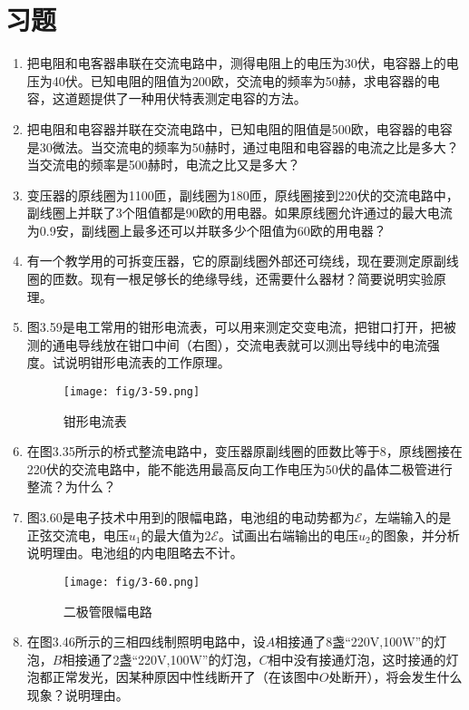 \section*{习题}
\begin{enumerate}
    \item 把电阻和电客器串联在交流电路中，测得电阻上的电压为30伏，电容器上的电压为40伏。已知电阻的阻值为200欧，交流电的频率为50赫，求电容器的电容，这道题提供了一种用伏特表测定电容的方法。
    \item 把电阻和电容器并联在交流电路中，已知电阻的阻值是500欧，电容器的电容是30微法。当交流电的频率为50赫时，通过电阻和电容器的电流之比是多大？当交流电的频率是500赫时，电流之比又是多大？
    \item 变压器的原线圈为1100匝，副线圈为180匝，原线圈接到220伏的交流电路中，副线圈上并联了3个阻值都是90欧的用电器。如果原线圈允许通过的最大电流为0.9安，副线圈上最多还可以并联多少个阻值为60欧的用电器？
    \item 有一个教学用的可拆变压器，它的原副线圈外部还可绕线，现在要测定原副线圈的匝数。现有一根足够长的绝缘导线，还需要什么器材？简要说明实验原理。
    \item 图3.59是电工常用的钳形电流表，可以用来测定交变电流，把钳口打开，把被测的通电导线放在钳口中间（右图），交流电表就可以测出导线中的电流强度。试说明钳形电流表的工作原理。
\begin{figure}[htp]\centering
\texttt{[image: fig/3-59.png]}
\caption{钳形电流表}
\end{figure}
    \item 在图3.35所示的桥式整流电路中，变压器原副线圈的匝数比等于8，原线圈接在220伏的交流电路中，能不能选用最高反向工作电压为50伏的晶体二极管进行整流？为什么？
    \item 图3.60是电子技术中用到的限幅电路，电池组的电动势都为$\mathcal{E}$，左端输入的是正弦交流电，电压$u_1$的最大值为$2\mathcal{E}$。试画出右端输出的电压$u_2$的图象，并分析说明理由。电池组的内电阻略去不计。
\begin{figure}[htp]\centering
\texttt{[image: fig/3-60.png]}
\caption{二极管限幅电路}
\end{figure}
    \item 在图3.46所示的三相四线制照明电路中，设$A$相接通了8盏“220V,100W”的灯泡，$B$相接通了2盏“220V,100W”的灯泡，$C$相中没有接通灯泡，这时接通的灯泡都正常发光，因某种原因中性线断开了（在该图中$O$处断开），将会发生什么现象？说明理由。
    

\end{enumerate}
